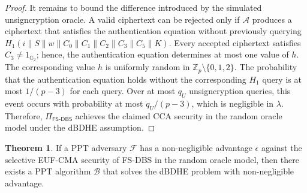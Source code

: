 \documentclass[sigconf,anonymous]{acmart}
\theoremstyle{definition}
\theoremstyle{definition}
\theoremstyle{definition}
\theoremstyle{definition}
\theoremstyle{definition}
\theoremstyle{definition}
\theoremstyle{definition}
\theoremstyle{definition}
\theoremstyle{definition}
\newtheorem{theorem}{Theorem}
\begin{document}
\begin{proof}
	It remains to bound the difference introduced by the simulated
	unsigncryption oracle. A valid ciphertext can be rejected only if
	$\mathcal{A}$ produces a ciphertext that satisfies the authentication
	equation without previously querying
$
	H_1(i\parallel S\parallel w\parallel C_0\parallel C_1\parallel
	C_2\parallel C_3\parallel C_5\parallel K)
$.
	Every accepted ciphertext satisfies $C_3\neq 1_{\mathbb{G}_2}$; hence,
	the authentication equation determines at most one value of $h$.
	The corresponding value $h$ is uniformly random
	in $\mathbb{Z}_p\setminus\{0,1,2\}$. The probability that the authentication equation holds without
	the corresponding $H_1$ query is at most $1/(p-3)$ for each query. Over at most $q_U$ unsigncryption queries, this
	event occurs with probability at most $q_U/(p-3)$, which is negligible
	in $\lambda$. Therefore, $\Pi_{\mathsf{FS\mbox{-}DBS}}$ achieves the claimed CCA security in the
	random oracle model under the dBDHE assumption.
\end{proof}
\begin{theorem}
	\label{theorem:EUFCMA}
	If a PPT adversary $\mathcal{F}$ has a non-negligible advantage
	$\epsilon$ against the selective EUF-CMA security of FS-DBS in the
	random oracle model, then there exists a PPT algorithm $\mathcal{B}$
	that solves the dBDHE problem with non-negligible advantage.
\end{theorem}
\end{document}
